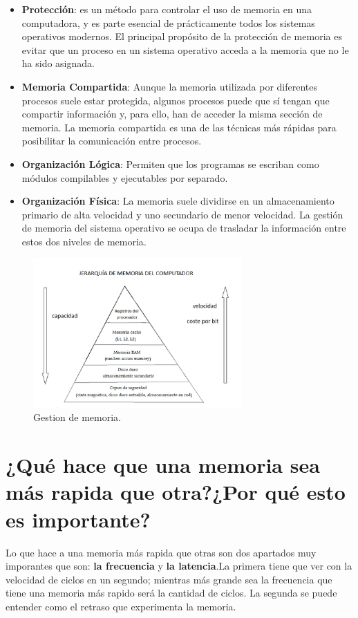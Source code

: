 \documentclass{article}
\begin{document}
\begin{itemize}
\item\textbf{Protección}: es un método para controlar el uso de memoria en una computadora, y es parte esencial de prácticamente todos los sistemas operativos modernos. El principal propósito de la protección de memoria es evitar que un proceso en un sistema operativo acceda a la memoria que no le ha sido asignada\cite{Sites.Google}.
\item\textbf{Memoria Compartida}: Aunque la memoria utilizada por diferentes procesos suele estar protegida, algunos procesos puede que sí tengan que compartir información y, para ello, han de acceder la misma sección de memoria. La memoria compartida es una de las técnicas más rápidas para posibilitar la comunicación entre procesos\cite{Sites.Google}.
\item\textbf{Organización Lógica}: Permiten que los programas se escriban como módulos compilables y ejecutables por separado\cite{Sites.Google}.
\item\textbf{Organización Física}: La memoria suele dividirse en un almacenamiento primario de alta velocidad y uno secundario de menor velocidad.  La gestión de memoria del sistema operativo se ocupa de trasladar la información entre estos dos niveles de memoria\cite{Sites.Google}.
\end{itemize}

\begin{figure}[h]
\includegraphics[width=8cm]{Jerarquia_memoria.png}
\centering
\caption{Gestion de memoria.\cite{Wikipedia}}
\label{Jerarquia_memoria.PNG}
\end{figure}
\section{¿Qué hace que una memoria sea más rapida que otra?¿Por qué esto es importante?}
 Lo que hace a una memoria más rapida que otras son dos apartados muy imporantes que son: \textbf{la frecuencia} y \textbf{la latencia}.La primera tiene que ver con la velocidad de ciclos en un segundo; mientras más grande sea la frecuencia que tiene una memoria más rapido será la cantidad de ciclos. La segunda se puede entender como el retraso que experimenta la memoria.
\vspace{0.2cm}
\end{document}

